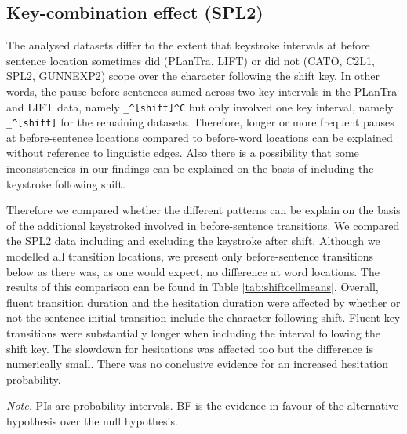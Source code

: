 \documentclass[
  english,
  man,floatsintext]{apa7}
\begin{document}
\begin{appendix}
\section{}
\hypertarget{key-combination-effect-spl2}{%
\subsection{Key-combination effect
(SPL2)}\label{key-combination-effect-spl2}}

The analysed datasets differ to the extent that keystroke intervals at
before sentence location sometimes did (PLanTra, LIFT) or did not (CATO,
C2L1, SPL2, GUNNEXP2) scope over the character following the shift key.
In other words, the pause before sentences sumed across two key
intervals in the PLanTra and LIFT data, namely
\texttt{\_\^{}{[}shift{]}\^{}C} but only involved one key interval,
namely \texttt{\_\^{}{[}shift{]}} for the remaining datasets. Therefore,
longer or more frequent pauses at before-sentence locations compared to
before-word locations can be explained without reference to linguistic
edges. Also there is a possibility that some inconsistencies in our
findings can be explained on the basis of including the keystroke
following shift.

Therefore we compared whether the different patterns can be explain on
the basis of the additional keystroked involved in before-sentence
transitions. We compared the SPL2 data including and excluding the
keystroke after shift. Although we modelled all transition locations, we
present only before-sentence transitions below as there was, as one
would expect, no difference at word locations. The results of this
comparison can be found in Table \ref{tab:shiftcellmeans}. Overall,
fluent transition duration and the hesitation duration were affected by
whether or not the sentence-initial transition include the character
following shift. Fluent key transitions were substantially longer when
including the interval following the shift key. The slowdown for
hesitations was affected too but the difference is numerically small.
There was no conclusive evidence for an increased hesitation
probability.

\begin{center}
\begin{ThreePartTable}

\begin{TableNotes}[para]
\normalsize{\textit{Note.} PIs are probability intervals. BF is the evidence in favour of the alternative hypothesis over the null hypothesis.}
\end{TableNotes}


\end{ThreePartTable}
\end{center}
\end{appendix}
\end{document}
